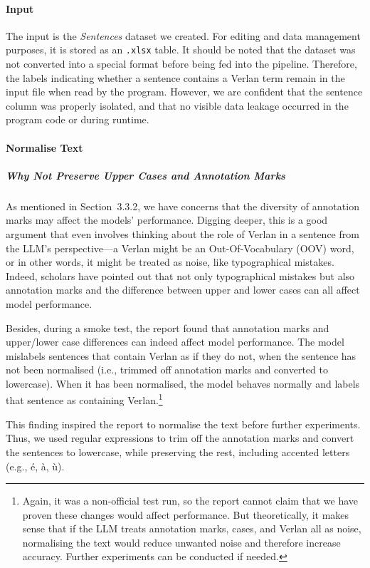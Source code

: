 \documentclass[12pt]{article}
\begin{document}
\paragraph{Input}
The input is the \textit{Sentences} dataset we created. For editing and data management purposes, it is stored as an \texttt{.xlsx} table. It should be noted that the dataset was not converted into a special format before being fed into the pipeline. Therefore, the labels indicating whether a sentence contains a Verlan term remain in the input file when read by the program. However, we are confident that the sentence column was properly isolated, and that no visible data leakage occurred in the program code or during runtime.

\paragraph{Normalise Text}
\subparagraph{Why Not Preserve Upper Cases and Annotation Marks}
As mentioned in Section~3.3.2, we have concerns that the diversity of annotation marks may affect the models' performance. Digging deeper, this is a good argument that even involves thinking about the role of Verlan in a sentence from the LLM's perspective\;---\;a Verlan might be an Out-Of-Vocabulary (OOV) word, or in other words, it might be treated as noise, like typographical mistakes. Indeed, scholars have pointed out that not only typographical mistakes but also annotation marks and the difference between upper and lower cases can all affect model performance\cite{alsharou2021noise}. 

Besides, during a smoke test, the report found that annotation marks and upper/lower case differences can indeed affect model performance. The model mislabels sentences that contain Verlan as if they do not, when the sentence has not been normalised (i.e., trimmed off annotation marks and converted to lowercase). When it has been normalised, the model behaves normally and labels that sentence as containing Verlan.\footnote{Again, it was a non-official test run, so the report cannot claim that we have proven these changes would affect performance. But theoretically, it makes sense that if the LLM treats annotation marks, cases, and Verlan all as noise, normalising the text would reduce unwanted noise and therefore increase accuracy. Further experiments can be conducted if needed.} 

This finding inspired the report to normalise the text before further experiments. Thus, we used regular expressions to trim off the annotation marks and convert the sentences to lowercase, while preserving the rest, including accented letters (e.g., é, à, ù).
\end{document}
